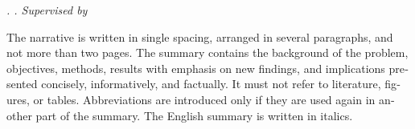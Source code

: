 \begin{otherlanguage}{english}
\itshape
\noindent
\MakeUppercase{\NamaPenulisInggris}. \JudulTesisInggris\unskip. Supervised by
\DaftarPembimbingKapitalInggris

The narrative is written in single spacing, arranged in several paragraphs,
and not more than two pages. The summary contains the background of the
problem, objectives, methods, results with emphasis on new findings, and
implications presented concisely, informatively, and factually. It must not
refer to literature, figures, or tables. Abbreviations are introduced only if
they are used again in another part of the summary. The English summary is
written in italics.
\end{otherlanguage}
